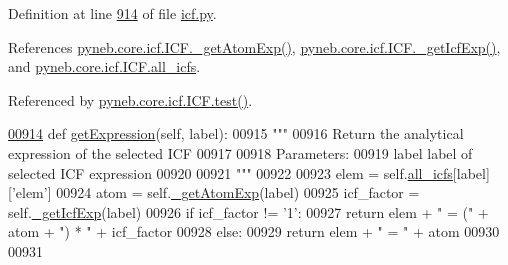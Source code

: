 Definition at line \hyperlink{icf_8py_source_l00914}{914} of file \hyperlink{icf_8py_source}{icf.\+py}.



References \hyperlink{icf_8py_source_l00730}{pyneb.\+core.\+icf.\+I\+C\+F.\+\_\+get\+Atom\+Exp()}, \hyperlink{icf_8py_source_l00738}{pyneb.\+core.\+icf.\+I\+C\+F.\+\_\+get\+Icf\+Exp()}, and \hyperlink{icf_8py_source_l00023}{pyneb.\+core.\+icf.\+I\+C\+F.\+all\+\_\+icfs}.



Referenced by \hyperlink{icf_8py_source_l01114}{pyneb.\+core.\+icf.\+I\+C\+F.\+test()}.


\begin{DoxyCode}
\hypertarget{classpyneb_1_1core_1_1icf_1_1_i_c_f_l00914}{}\hyperlink{classpyneb_1_1core_1_1icf_1_1_i_c_f_ad620cb1c02943f4be858ca9f3d3d8300}{00914}     \textcolor{keyword}{def }\hyperlink{classpyneb_1_1core_1_1icf_1_1_i_c_f_ad620cb1c02943f4be858ca9f3d3d8300}{getExpression}(self, label): 
00915         \textcolor{stringliteral}{""" }
00916 \textcolor{stringliteral}{        Return the analytical expression of the selected ICF }
00917 \textcolor{stringliteral}{        }
00918 \textcolor{stringliteral}{        Parameters:}
00919 \textcolor{stringliteral}{            label    label of selected ICF expression}
00920 \textcolor{stringliteral}{}
00921 \textcolor{stringliteral}{        """}
00922         
00923         elem = self.\hyperlink{classpyneb_1_1core_1_1icf_1_1_i_c_f_a854ee87a53feb102e429e902227ce88b}{all\_icfs}[label][\textcolor{stringliteral}{'elem'}]
00924         atom = self.\hyperlink{classpyneb_1_1core_1_1icf_1_1_i_c_f_a6d82c58aa562e61e6074c6b8757583c4}{\_getAtomExp}(label)
00925         icf\_factor = self.\hyperlink{classpyneb_1_1core_1_1icf_1_1_i_c_f_aa0ed356c2833c48010dfc7aa71a07419}{\_getIcfExp}(label)
00926         \textcolor{keywordflow}{if} icf\_factor != \textcolor{stringliteral}{'1'}:
00927             \textcolor{keywordflow}{return} elem + \textcolor{stringliteral}{" = ("} + atom + \textcolor{stringliteral}{") * "} + icf\_factor
00928         \textcolor{keywordflow}{else}:
00929             \textcolor{keywordflow}{return} elem + \textcolor{stringliteral}{" = "} + atom
00930      
00931              
\end{DoxyCode}
\hypertarget{classpyneb_1_1core_1_1icf_1_1_i_c_f_a6dd48b2037e45deb624effc6ac91c841}{}
